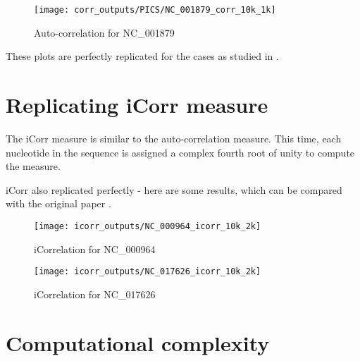 \documentclass[10pt]{article}
\begin{document}
\begin{figure}[H]
\centering
\texttt{[image: corr\_outputs/PICS/NC\_001879\_corr\_10k\_1k]}
\captionsetup{justification=centering}
\caption{Auto-correlation for NC\_001879 }
\end{figure}


These plots are perfectly replicated for the cases as studied in \cite{autocorr}.


\section{Replicating iCorr measure}
The iCorr measure is similar to the auto-correlation measure. This time, each nucleotide in the sequence is assigned a complex fourth root of unity to compute the measure.

iCorr also replicated perfectly - here are some results, which can be compared with the original paper \cite{icorr}.


\begin{figure}[H]
\centering
\texttt{[image: icorr\_outputs/NC\_000964\_icorr\_10k\_2k]}
\captionsetup{justification=centering}
\caption{iCorrelation for NC\_000964 }
\end{figure}

\begin{figure}[H]
\centering
\texttt{[image: icorr\_outputs/NC\_017626\_icorr\_10k\_2k]}
\captionsetup{justification=centering}
\caption{iCorrelation for NC\_017626}
\end{figure}




\section{Computational complexity}
\end{document}
